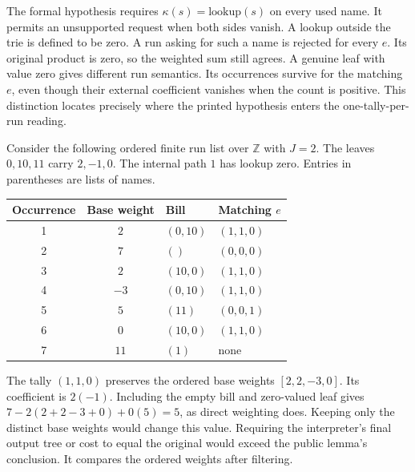 
\clearpage
{}

The formal hypothesis requires $\kappa(s)=\mathrm{lookup}(s)$ on every
used name. It permits an unsupported request when both sides vanish. A lookup outside the trie is defined to be zero. A run asking
for such a name is rejected for every $e$. Its original product is zero,
so the weighted sum still agrees. A genuine leaf with value zero gives
different run semantics. Its occurrences survive for the matching $e$,
even though their external coefficient vanishes when the count is positive.
This distinction locates precisely where the printed hypothesis enters the
one-tally-per-run reading.

Consider the following ordered finite run list over $\mathbb Z$ with $J=2$.
The leaves $0,10,11$ carry $2,-1,0$. The internal path $1$ has lookup
zero. Entries in parentheses are lists of names.
\begin{center}
\begin{tabular}{ccll}
Occurrence & Base weight & Bill & Matching $e$ \\
\hline
1 & $2$  & $(0,10)$ & $(1,1,0)$ \\
2 & $7$  & $()$     & $(0,0,0)$ \\
3 & $2$  & $(10,0)$ & $(1,1,0)$ \\
4 & $-3$ & $(0,10)$ & $(1,1,0)$ \\
5 & $5$  & $(11)$   & $(0,0,1)$ \\
6 & $0$  & $(10,0)$ & $(1,1,0)$ \\
7 & $11$ & $(1)$    & none
\end{tabular}
\end{center}
The tally $(1,1,0)$ preserves the ordered base weights $[2,2,-3,0]$. Its coefficient is $2(-1)$. Including the empty bill and zero-valued leaf
gives $7-2(2+2-3+0)+0(5)=5$, as direct weighting does. Keeping only the
distinct base weights would change this value. Requiring the interpreter's
final output tree or cost to equal the original would exceed the public
lemma's conclusion. It compares the ordered weights after filtering.

